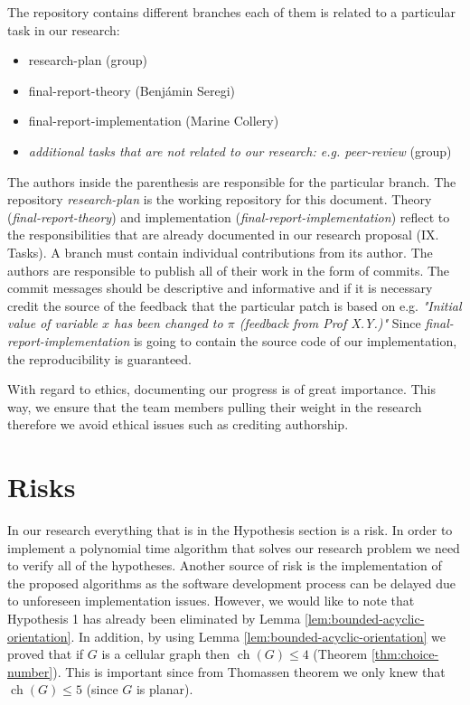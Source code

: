 \documentclass[letterpaper, 10 pt, conference]{ieeeconf}  %
\DeclareMathOperator*{\ch}{ch}
\begin{document}
The repository contains different branches each of them is related to a particular task in our research:
\begin{itemize}
\item research-plan (group)
\item final-report-theory (Benjámin Seregi)
\item final-report-implementation (Marine Collery)
\item \textit{additional tasks that are not related to our research: e.g. peer-review} (group)
\end{itemize}
The authors inside the parenthesis are responsible for the particular branch. The repository \textit{research-plan} is the working repository for this document. Theory (\textit{final-report-theory}) and implementation (\textit{final-report-implementation}) reflect to the responsibilities that are already documented in our research proposal (IX. Tasks).
A branch must contain individual contributions from its author. The authors are responsible to publish all of their work in the form of commits. The commit messages should be descriptive and informative and if it is necessary credit the source of the feedback that the particular patch is based on e.g. \textit{"Initial value of variable $x$ has been changed to $\pi$ (feedback from Prof X.Y.)"}
Since \textit{final-report-implementation} is going to contain the source code of our implementation, the reproducibility is guaranteed.

With regard to ethics, documenting our progress is of great importance. This way, we ensure that the team members pulling their weight in the research therefore we avoid ethical issues such as crediting authorship.


\section{Risks}
In our research everything that is in the Hypothesis section is a risk. In order to implement a polynomial time algorithm that solves our research problem we need to verify all of the hypotheses. Another source of risk is the implementation of the proposed algorithms as the software development process can be delayed due to unforeseen implementation issues.
However, we would like to note that Hypothesis 1 has already been eliminated by Lemma \ref{lem:bounded-acyclic-orientation}. In addition, by using Lemma \ref{lem:bounded-acyclic-orientation} we proved that if $G$ is a cellular graph then $\ch(G) \leqslant 4$ (Theorem \ref{thm:choice-number}). This is important since from Thomassen theorem \cite{Thomassen:1994:PG:184180.184192} we only knew that $\ch(G) \leqslant 5$ (since $G$ is planar).
\end{document}
